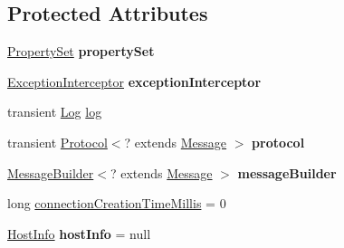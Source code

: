 \subsection*{Protected Attributes}
\begin{DoxyCompactItemize}
\item 
\mbox{\label{classcom_1_1mysql_1_1cj_1_1_core_session_aaa42c32fbec5d044050f66d5bd9ed1cd}} 
\mbox{\hyperlink{interfacecom_1_1mysql_1_1cj_1_1conf_1_1_property_set}{Property\+Set}} {\bfseries property\+Set}
\item 
\mbox{\label{classcom_1_1mysql_1_1cj_1_1_core_session_a60aecfa7655db14a1c4d4c2e7bbfab64}} 
\mbox{\hyperlink{interfacecom_1_1mysql_1_1cj_1_1exceptions_1_1_exception_interceptor}{Exception\+Interceptor}} {\bfseries exception\+Interceptor}
\item 
transient \mbox{\hyperlink{interfacecom_1_1mysql_1_1cj_1_1log_1_1_log}{Log}} \mbox{\hyperlink{classcom_1_1mysql_1_1cj_1_1_core_session_a6926baf1d1d13a6ebdced04244ebfe3d}{log}}
\item 
\mbox{\label{classcom_1_1mysql_1_1cj_1_1_core_session_adaf1b16630ef19f657dd0b191ee51fe2}} 
transient \mbox{\hyperlink{interfacecom_1_1mysql_1_1cj_1_1protocol_1_1_protocol}{Protocol}}$<$? extends \mbox{\hyperlink{interfacecom_1_1mysql_1_1cj_1_1protocol_1_1_message}{Message}} $>$ {\bfseries protocol}
\item 
\mbox{\label{classcom_1_1mysql_1_1cj_1_1_core_session_a563e6b084b83c72df32f407cd6c201ac}} 
\mbox{\hyperlink{interfacecom_1_1mysql_1_1cj_1_1_message_builder}{Message\+Builder}}$<$? extends \mbox{\hyperlink{interfacecom_1_1mysql_1_1cj_1_1protocol_1_1_message}{Message}} $>$ {\bfseries message\+Builder}
\item 
long \mbox{\hyperlink{classcom_1_1mysql_1_1cj_1_1_core_session_afe99c9d8a829f985f424087e61f4cad6}{connection\+Creation\+Time\+Millis}} = 0
\item 
\mbox{\label{classcom_1_1mysql_1_1cj_1_1_core_session_ac60f96087dc4f9a719f136f8fb74fddf}} 
\mbox{\hyperlink{classcom_1_1mysql_1_1cj_1_1conf_1_1_host_info}{Host\+Info}} {\bfseries host\+Info} = null
\item 

\end{DoxyCompactItemize}

